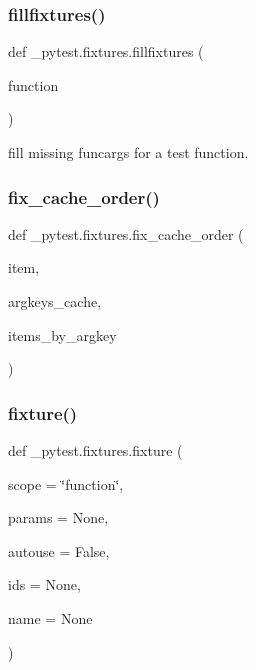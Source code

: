 \mbox{\label{namespace__pytest_1_1fixtures_ab51e45645c048bd941b30a831c6de613}} 
\subsubsection{\texorpdfstring{fillfixtures()}{fillfixtures()}}
{\footnotesize\ttfamily def \+\_\+pytest.\+fixtures.\+fillfixtures (\begin{DoxyParamCaption}\item[{}]{function }\end{DoxyParamCaption})}

\begin{DoxyVerb}fill missing funcargs for a test function. \end{DoxyVerb}
 \mbox{\label{namespace__pytest_1_1fixtures_a90425ae7b8fd46e6cd3b3f56b53c07a5}} 
\subsubsection{\texorpdfstring{fix\+\_\+cache\+\_\+order()}{fix\_cache\_order()}}
{\footnotesize\ttfamily def \+\_\+pytest.\+fixtures.\+fix\+\_\+cache\+\_\+order (\begin{DoxyParamCaption}\item[{}]{item,  }\item[{}]{argkeys\+\_\+cache,  }\item[{}]{items\+\_\+by\+\_\+argkey }\end{DoxyParamCaption})}

\mbox{\label{namespace__pytest_1_1fixtures_a7f10df0ff0d8d2c5e29e89f022c59d15}} 
\subsubsection{\texorpdfstring{fixture()}{fixture()}}
{\footnotesize\ttfamily def \+\_\+pytest.\+fixtures.\+fixture (\begin{DoxyParamCaption}\item[{}]{scope = {\ttfamily \char`\"{}function\char`\"{}},  }\item[{}]{params = {\ttfamily None},  }\item[{}]{autouse = {\ttfamily False},  }\item[{}]{ids = {\ttfamily None},  }\item[{}]{name = {\ttfamily None} }\end{DoxyParamCaption})}

